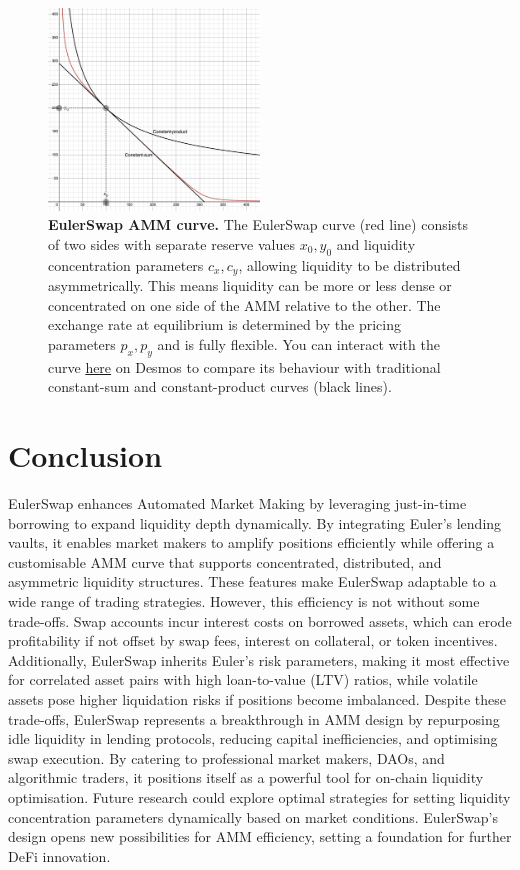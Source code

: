 \documentclass{article}
\begin{document}
 \begin{figure}[h]  %
    \centering  %
    \includegraphics[width=0.5\textwidth]{curve.png} %
    \caption{\textbf{EulerSwap AMM curve.} The EulerSwap curve (red line) consists of two sides with separate reserve values $x_0, y_0$ and liquidity concentration parameters $c_x, c_y$, allowing liquidity to be distributed asymmetrically. This means liquidity can be more or less dense or concentrated on one side of the AMM relative to the other. The exchange rate at equilibrium is determined by the pricing parameters $p_x, p_y$ and is fully flexible. You can interact with the curve \href{https://www.desmos.com/calculator/gzwmvbs1dk}{here} on Desmos to compare its behaviour with traditional constant-sum and constant-product curves (black lines).}
    \label{fig:fig1}  %
\end{figure}

\section{Conclusion}

EulerSwap enhances Automated Market Making by leveraging just-in-time borrowing to expand liquidity depth dynamically. By integrating Euler’s lending vaults, it enables market makers to amplify positions efficiently while offering a customisable AMM curve that supports concentrated, distributed, and asymmetric liquidity structures. These features make EulerSwap adaptable to a wide range of trading strategies. However, this efficiency is not without some trade-offs. Swap accounts incur interest costs on borrowed assets, which can erode profitability if not offset by swap fees, interest on collateral, or token incentives. Additionally, EulerSwap inherits Euler’s risk parameters, making it most effective for correlated asset pairs with high loan-to-value (LTV) ratios, while volatile assets pose higher liquidation risks if positions become imbalanced. Despite these trade-offs, EulerSwap represents a breakthrough in AMM design by repurposing idle liquidity in lending protocols, reducing capital inefficiencies, and optimising swap execution. By catering to professional market makers, DAOs, and algorithmic traders, it positions itself as a powerful tool for on-chain liquidity optimisation. Future research could explore optimal strategies for setting liquidity concentration parameters dynamically based on market conditions. EulerSwap's design opens new possibilities for AMM efficiency, setting a foundation for further DeFi innovation.
\end{document}
